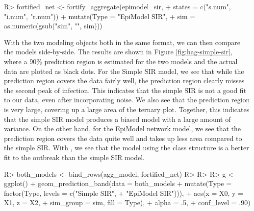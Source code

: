 \documentclass[
  shortnames]{jss}
\begin{document}
\begin{CodeChunk}
\begin{CodeInput}
R> fortified_net <- fortify_aggregate(epimodel_sir, 
+                                    states = c("s.num", "i.num", "r.num")) %
+   mutate(Type = "EpiModel SIR",
+          sim = as.numeric(gsub("sim", "", sim)))
\end{CodeInput}
\end{CodeChunk}

With the two modeling objects both in the same format, we can then
compare the models side-by-side. The results are shown in Figure
\ref{fig:hag-simple-sir}, where a 90\% prediction region is estimated
for the two models and the actual data are plotted as black dots. For
the Simple SIR model, we see that while the prediction region covers the
data fairly well, the prediction region clearly misses the second peak
of infection. This indicates that the simple SIR is not a good fit to
our data, even after incorporating noise. We also see that the
prediction region is very large, covering up a large area of the ternary
plot. Together, this indicates that the simple SIR model produces a
biased model with a large amount of variance. On the other hand, for the
EpiModel network model, we see that the prediction region covers the
data quite well and takes up less area compared to the simple SIR. With
, we see that the model using the class structure is a
better fit to the outbreak than the simple SIR model.

\begin{CodeChunk}
\begin{CodeInput}
R> both_models <- bind_rows(agg_model, fortified_net)
R> 
R> 
R> g <- ggplot() + geom_prediction_band(data = both_models %
+                   mutate(Type = factor(Type, levels = c("Simple SIR", 
+                                                         "EpiModel SIR"))),
+          aes(x = X0, y = X1, z = X2,
+               sim_group = sim, fill = Type),
+          alpha = .5,
+          conf_level = .90) 
\end{CodeInput}
\end{CodeChunk}
\end{document}
